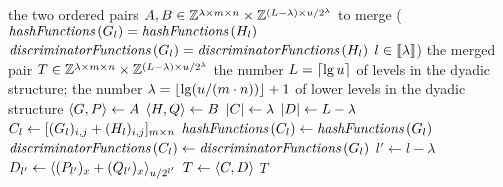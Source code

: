 \begin{algorithmic}[1]
  \In the two ordered pairs \( \cramped{A, B \in \integers^{\lambda \times m \times n} \times \integers^{(L - \lambda) \times u / 2^{\lambda}}} \) to merge (\( \hashFunctions (G_{l}) = \hashFunctions (H_{l}) \) \LAnd{} \( \discriminatorFunctions (G_{l}) = \discriminatorFunctions (H_{l}) \) \LForAll{} \( l \in \llbracket\lambda\rrbracket \))
  \Out the merged pair \( \cramped{T \in \integers^{\lambda \times m \times n} \times \integers^{(L - \lambda) \times u / 2^{\lambda}}} \)
  \Constant the number \( L = \lceil\lg u\rceil \) of levels in the dyadic structure; the number \( \lambda = \lfloor\lg (u / (m \cdot n))\rfloor + 1 \) of lower levels in the dyadic structure
    \State \( \langle G, P\rangle \gets A \)
    \State \( \langle H, Q\rangle \gets B \)
    \State \( \lvert C\rvert \gets \lambda \)
    \State \( \lvert D\rvert \gets L - \lambda \)
        \State \( C_{l} \gets \lbrack(G_{l})_{i, j} + (H_{l})_{i, j}\rbrack_{m \times n} \)
        \State \( \hashFunctions (C_{l}) \gets \hashFunctions (G_{l}) \)
        \State \( \discriminatorFunctions (C_{l}) \gets \discriminatorFunctions (G_{l}) \)
      \Else
        \State \( l' \gets l - \lambda \)
        \State \( D_{l'} \gets \langle(P_{l'})_{x} + (Q_{l'})_{x}\rangle_{u / 2^{l'}} \)
      \EndIf
    \EndFor
    \State \( T \gets \langle C, D\rangle \)
    \State \Return \( T \)
  \EndFunction
\end{algorithmic}
